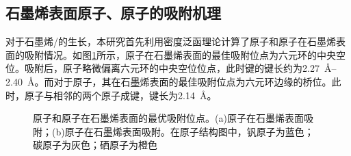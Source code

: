     \subsection{石墨烯表面原子、原子的吸附机理}
    \label{cap:VS}
    对于石墨烯/的生长，本研究首先利用密度泛函理论计算了原子和原子在石墨烯表面的吸附情况。如图\ref{fig:VS_VandSeOnG}所示，原子在石墨烯表面的最佳吸附位点为六元环的中央空位。吸附后，原子略微偏离六元环的中央空位位点，此时键的键长约为\SIrange[range-phrase=$\sim$]{2.27}{2.40}{\angstrom}。而对于原子，其在石墨烯表面的最佳吸附位点为六元环边缘的桥位。此时，原子与相邻的两个原子成键，键长为\SI{2.14}{\angstrom}。

    \begin{figure}[htb]
        \caption{原子和原子在石墨烯表面的最优吸附位点。(a)原子在石墨烯表面吸附；(b)原子在石墨烯表面吸附。在原子结构图中，钒原子为蓝色；碳原子为灰色；硒原子为橙色}
        \label{fig:VS_VandSeOnG}
    \end{figure}


